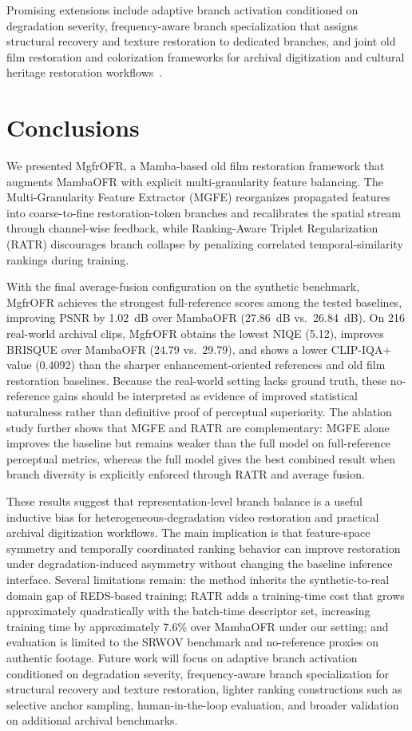 \documentclass[symmetry,article,submit,pdftex,moreauthors]{Definitions/mdpi}
\begin{document}
Promising extensions include adaptive branch activation conditioned on degradation severity, frequency-aware branch specialization that assigns structural recovery and texture restoration to dedicated branches, and joint old film restoration and colorization frameworks for archival digitization and cultural heritage restoration workflows~\cite{kokaram2004missing}.
\section{Conclusions}
\label{sec:conclusion}

We presented MgfrOFR, a Mamba-based old film restoration framework that augments MambaOFR with explicit multi-granularity feature balancing. The Multi-Granularity Feature Extractor (MGFE) reorganizes propagated features into coarse-to-fine restoration-token branches and recalibrates the spatial stream through channel-wise feedback, while Ranking-Aware Triplet Regularization (RATR) discourages branch collapse by penalizing correlated temporal-similarity rankings during training.

With the final average-fusion configuration on the synthetic benchmark, MgfrOFR achieves the strongest full-reference scores among the tested baselines, improving PSNR by 1.02~dB over MambaOFR (27.86~dB vs.\ 26.84~dB). On 216 real-world archival clips, MgfrOFR obtains the lowest NIQE (5.12), improves BRISQUE over MambaOFR (24.79 vs.\ 29.79), and shows a lower CLIP-IQA+ value (0.4092) than the sharper enhancement-oriented references and old film restoration baselines. Because the real-world setting lacks ground truth, these no-reference gains should be interpreted as evidence of improved statistical naturalness rather than definitive proof of perceptual superiority. The ablation study further shows that MGFE and RATR are complementary: MGFE alone improves the baseline but remains weaker than the full model on full-reference perceptual metrics, whereas the full model gives the best combined result when branch diversity is explicitly enforced through RATR and average fusion.

These results suggest that representation-level branch balance is a useful inductive bias for heterogeneous-degradation video restoration and practical archival digitization workflows. The main implication is that feature-space symmetry and temporally coordinated ranking behavior can improve restoration under degradation-induced asymmetry without changing the baseline inference interface. Several limitations remain: the method inherits the synthetic-to-real domain gap of REDS-based training; RATR adds a training-time cost that grows approximately quadratically with the batch-time descriptor set, increasing training time by approximately 7.6\% over MambaOFR under our setting; and evaluation is limited to the SRWOV benchmark and no-reference proxies on authentic footage. Future work will focus on adaptive branch activation conditioned on degradation severity, frequency-aware branch specialization for structural recovery and texture restoration, lighter ranking constructions such as selective anchor sampling, human-in-the-loop evaluation, and broader validation on additional archival benchmarks.
 
\end{document}
